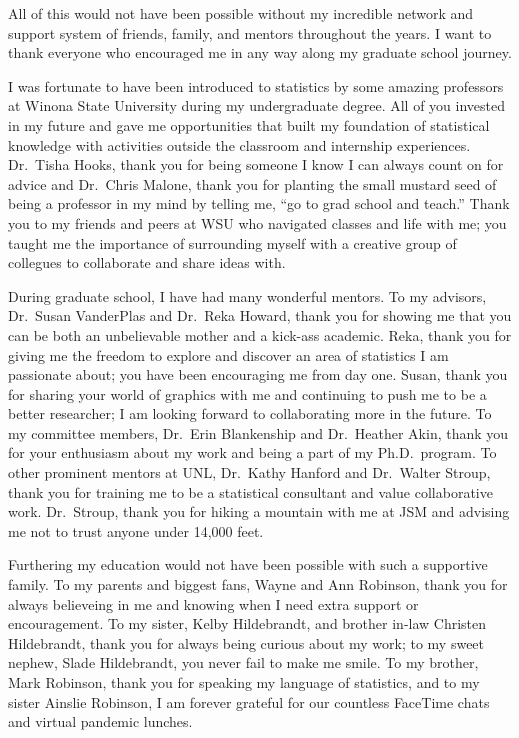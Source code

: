 \documentclass[print]{nuthesis}
\begin{document}

\begin{acknowledgments}
All of this would not have been possible without my incredible network and support system of friends, family, and mentors throughout the years. I want to thank everyone who encouraged me in any way along my graduate school journey.

I was fortunate to have been introduced to statistics by some amazing professors at Winona State University during my undergraduate degree. All of you invested in my future and gave me opportunities that built my foundation of statistical knowledge with activities outside the classroom and internship experiences. Dr.~Tisha Hooks, thank you for being someone I know I can always count on for advice and Dr.~Chris Malone, thank you for planting the small mustard seed of being a professor in my mind by telling me, ``go to grad school and teach.'' Thank you to my friends and peers at WSU who navigated classes and life with me; you taught me the importance of surrounding myself with a creative group of collegues to collaborate and share ideas with.

During graduate school, I have had many wonderful mentors. To my advisors, Dr.~Susan VanderPlas and Dr.~Reka Howard, thank you for showing me that you can be both an unbelievable mother and a kick-ass academic. Reka, thank you for giving me the freedom to explore and discover an area of statistics I am passionate about; you have been encouraging me from day one. Susan, thank you for sharing your world of graphics with me and continuing to push me to be a better researcher; I am looking forward to collaborating more in the future. To my committee members, Dr.~Erin Blankenship and Dr.~Heather Akin, thank you for your enthusiasm about my work and being a part of my Ph.D.~program. To other prominent mentors at UNL, Dr.~Kathy Hanford and Dr.~Walter Stroup, thank you for training me to be a statistical consultant and value collaborative work. Dr.~Stroup, thank you for hiking a mountain with me at JSM and advising me not to trust anyone under 14,000 feet.

Furthering my education would not have been possible with such a supportive family. To my parents and biggest fans, Wayne and Ann Robinson, thank you for always believeing in me and knowing when I need extra support or encouragement. To my sister, Kelby Hildebrandt, and brother in-law Christen Hildebrandt, thank you for always being curious about my work; to my sweet nephew, Slade Hildebrandt, you never fail to make me smile. To my brother, Mark Robinson, thank you for speaking my language of statistics, and to my sister Ainslie Robinson, I am forever grateful for our countless FaceTime chats and virtual pandemic lunches.


\end{acknowledgments}
\end{document}
